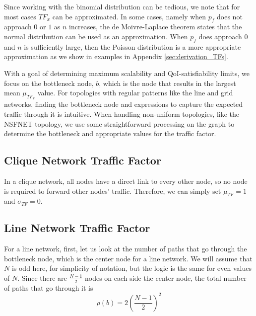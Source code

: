 Since working with the binomial distribution can be tedious, we note that for most cases $TF_x$ can be approximated.  In some cases, namely when $p_f$ does not approach $0$ or $1$ as $n$ increases, the de Moivre-Laplace theorem states that the normal distribution can be used as an approximation.  When $p_f$ does approach $0$ and $n$ is sufficiently large, then the Poisson distribution is a more appropriate approximation as we show in examples in Appendix \ref{sec:derivation_TFs}. 


With a goal of determining maximum scalability and QoI-satisfiability limits, we focus on the bottleneck node, $b$, which is the node that results in the largest mean $\mu_{TF_x}$ value. For topologies with regular patterns like the line and grid networks, finding the bottleneck node and expressions to capture the expected traffic through it is intuitive. When handling non-uniform topologies, like the NSFNET topology, we use some straightforward processing on the graph to determine the bottleneck and appropriate values for the traffic factor.

\subsection{Clique Network Traffic Factor}
In a clique network, all nodes have a direct link to every other node, so no node is required to forward other nodes' traffic.  Therefore, we can simply set $\mu_{TF} = 1$ and $\sigma_{TF} = 0$.

\subsection{Line Network Traffic Factor}

For a line network, first, let us look at the number of paths that go through the bottleneck node, which is the center node for a line network.  We will assume that $N$ is odd here, for simplicity of notation, but the logic is the same for even values of $N$.  Since there are $\frac{N-1}{2}$ nodes on each side the center node, the total number of paths that go through it is
\begin{equation*}
	\rho(b) = 2(\frac{N-1}{2})^2
\end{equation*}

